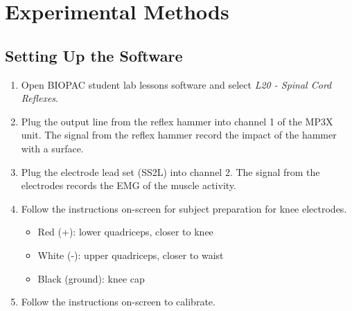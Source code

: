\documentclass{article}
\begin{document}
\section*{Experimental Methods}
\subsection*{Setting Up the Software}
\begin{enumerate}
	\item Open BIOPAC student lab lessons software and select \textit{L20 - Spinal Cord Reflexes}.
	\item Plug the output line from the reflex hammer into channel 1 of the MP3X unit. The signal from the reflex hammer record the impact of the hammer with a surface.
	\item Plug the electrode lead set (SS2L) into channel 2. The signal from the electrodes records the EMG of the muscle activity.
	\item Follow the instructions on-screen for subject preparation for knee electrodes.
		\begin{itemize}
			\item Red (+): lower quadriceps, closer to knee
			\item White (-): upper quadriceps, closer to waist
			\item Black (ground): knee cap
		\end{itemize}
	\item Follow the instructions on-screen to calibrate.
\end{enumerate}
\end{document}
